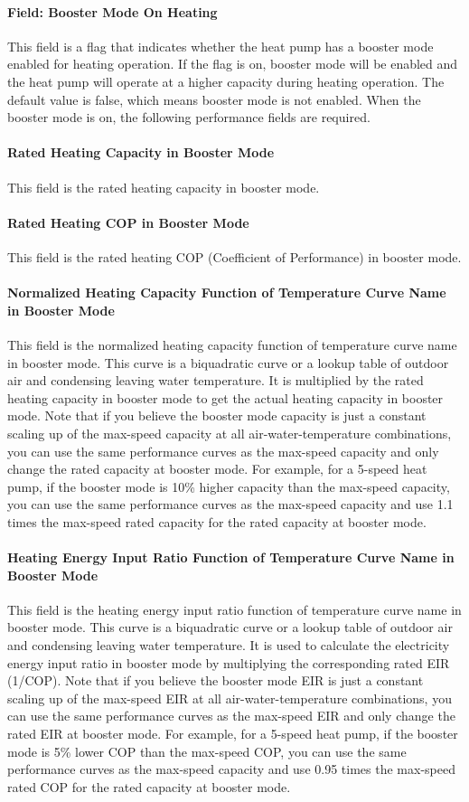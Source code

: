 \paragraph{Field: Booster Mode On Heating} This field is a flag that indicates
whether the heat pump has a booster mode enabled for heating operation. If the
flag is on, booster mode will be enabled and the heat pump will operate at a
higher capacity during heating operation. The default value is false, which
means booster mode is not enabled. When the booster mode is on, the following
performance fields are required.
\paragraph{Rated Heating Capacity in Booster Mode} This field is the rated
heating capacity in booster mode.
\paragraph{Rated Heating COP in Booster Mode} This field is the rated heating
COP (Coefficient of Performance) in booster mode.
\paragraph{Normalized Heating Capacity Function of Temperature Curve Name in
Booster Mode} This field is the normalized heating capacity function of
temperature curve name in booster mode. This curve is a biquadratic curve or a
lookup table of outdoor air and condensing leaving water temperature. It is
multiplied by the rated heating capacity in booster mode to get the actual
heating capacity in booster mode. Note that if you believe the booster mode
capacity is just a constant scaling up of the max-speed capacity at all
air-water-temperature combinations, you can use the same performance curves as
the max-speed capacity and only change the rated capacity at booster mode.
For example, for a 5-speed heat pump, if the booster mode is 10\% higher capacity
than the max-speed capacity, you can use the same performance curves as the max-speed
capacity and use 1.1 times the max-speed rated capacity for the rated capacity at booster mode.
\paragraph{Heating Energy Input Ratio Function of Temperature Curve Name in
Booster Mode} This field is the heating energy input ratio function of
temperature curve name in booster mode. This curve is a biquadratic curve or a
lookup table of outdoor air and condensing leaving water temperature. It is used
to calculate the electricity energy input ratio in booster mode by multiplying
the corresponding rated EIR (1/COP). Note that if you believe the booster mode
EIR is just a constant scaling up of the max-speed EIR at all
air-water-temperature combinations, you can use the same performance curves as
the max-speed EIR and only change the rated EIR at booster mode.
For example, for a 5-speed heat pump, if the booster mode is 5\% lower COP
than the max-speed COP, you can use the same performance curves as the max-speed
capacity and use 0.95 times the max-speed rated COP for the rated capacity at booster mode.
